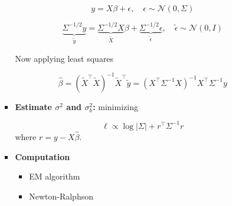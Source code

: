 \documentclass{article}
\begin{document}
\begin{itemize}
\begin{itemize}
\begin{itemize}
            \[
              y = X\beta + \epsilon, \quad \epsilon \sim \mathcal{N}(0, \Sigma)
            \]

            \[
              \underbrace{\Sigma^{-1/2} y}_{\tilde{y}} = \underbrace{\Sigma^{-1/2} X}_{\tilde{X}} \beta + \underbrace{\Sigma^{-1/2} \epsilon}_{\tilde{\epsilon}}, \quad \tilde{\epsilon} \sim \mathcal{N}(0, I)
            \]

            Now applying least squares

            \[
              \hat{\beta} = (\tilde{X}^\top \tilde{X})^{-1} \tilde{X}^\top \tilde{y}
              = (X^\top \Sigma^{-1} X)^{-1} X^\top \Sigma^{-1} y
            \]

          \item \textbf{Estimate $\sigma^2$ and $\sigma_b^2$:} minimizing

            \[
              \ell \propto \log |\Sigma| + r^\top \Sigma^{-1} r
            \]
            where $r = y - X \hat{\beta}$.

          \item\textbf{Computation}
            \begin{itemize}
              \item EM algorithm
              \item Newton-Ralphson
            \end{itemize}


\end{itemize}
\end{itemize}
\end{itemize}
\end{document}
